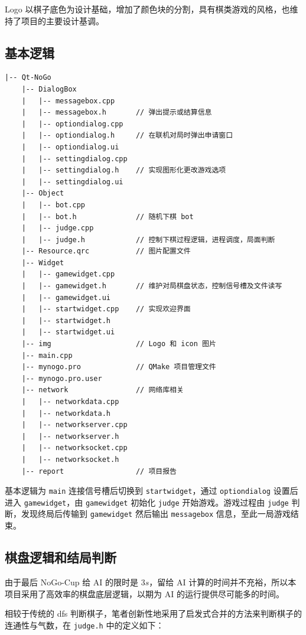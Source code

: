 \documentclass{noithesis}
\begin{document}
	Logo 以棋子底色为设计基础，增加了颜色块的分割，具有棋类游戏的风格，也维持了项目的主要设计基调。

	\subsection{基本逻辑}
	
    \begin{verbatim}
|-- Qt-NoGo
    |-- DialogBox
    |   |-- messagebox.cpp
    |   |-- messagebox.h       // 弹出提示或结算信息
    |   |-- optiondialog.cpp
    |   |-- optiondialog.h     // 在联机对局时弹出申请窗口
    |   |-- optiondialog.ui
    |   |-- settingdialog.cpp
    |   |-- settingdialog.h    // 实现图形化更改游戏选项
    |   |-- settingdialog.ui
    |-- Object
    |   |-- bot.cpp
    |   |-- bot.h              // 随机下棋 bot
    |   |-- judge.cpp
    |   |-- judge.h            // 控制下棋过程逻辑，进程调度，局面判断
    |-- Resource.qrc           // 图片配置文件
    |-- Widget
    |   |-- gamewidget.cpp
    |   |-- gamewidget.h       // 维护对局棋盘状态，控制信号槽及文件读写
    |   |-- gamewidget.ui
    |   |-- startwidget.cpp    // 实现欢迎界面
    |   |-- startwidget.h
    |   |-- startwidget.ui
    |-- img                    // Logo 和 icon 图片
    |-- main.cpp
    |-- mynogo.pro             // QMake 项目管理文件
    |-- mynogo.pro.user
    |-- network                // 网络库相关
    |   |-- networkdata.cpp
    |   |-- networkdata.h
    |   |-- networkserver.cpp
    |   |-- networkserver.h
    |   |-- networksocket.cpp
    |   |-- networksocket.h
    |-- report                 // 项目报告
	\end{verbatim}

	基本逻辑为 \verb|main| 连接信号槽后切换到 \verb|startwidget|，通过 \verb|optiondialog| 设置后进入 \verb|gamewidget|，由 \verb|gamewidget| 初始化 \verb|judge| 开始游戏。游戏过程由 \verb|judge| 判断，发现终局后传输到 \verb|gamewidget| 然后输出 \verb|messagebox| 信息，至此一局游戏结束。

	\subsection{棋盘逻辑和结局判断}
	
	由于最后 NoGo-Cup 给 AI 的限时是 $3s$，留给 AI 计算的时间并不充裕，所以本项目采用了高效率的棋盘底层逻辑，以期为 AI 的运行提供尽可能多的时间。
	
	相较于传统的 dfs 判断棋子，笔者创新性地采用了启发式合并的方法来判断棋子的连通性与气数，在 \verb|judge.h| 中的定义如下：
	
\end{document}
